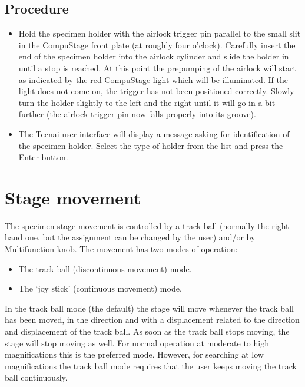 \documentclass[12pt]{article}
\begin{document}
\subsection{Procedure}
\begin{itemize}
\item Hold the specimen holder with the airlock trigger pin parallel
to the small slit in the CompuStage front plate (at roughly four
o'clock). Carefully insert the end of the specimen holder into the
airlock cylinder and slide the holder in until a stop is reached. At
this point the prepumping of the airlock will start as indicated by the
red CompuStage light which will be illuminated. If the light does not
come on, the trigger has not been positioned correctly. Slowly turn
the holder slightly to the left and the right until it will go in a
bit further (the airlock trigger pin now falls properly into its groove).

\item The Tecnai user interface will display a message asking for
identification of the specimen holder. Select the type of holder from
the list and press the Enter button.

\end{itemize}

\section{Stage movement}

The specimen stage movement is controlled by a track ball (normally the
right-hand one, but the assignment can be changed by the user) and/or
by Multifunction knob. The movement has two modes of operation:

\begin{itemize}
\item The track ball (discontinuous movement) mode.
\item The `joy stick' (continuous movement) mode.
\end{itemize}

In the track ball mode (the default) the stage will move whenever the
track ball has been moved, in the direction and with a displacement
related to the direction and displacement of the track ball. As soon as
the track ball stops moving, the stage will stop moving as well. For
normal operation at moderate to high magnifications this is the
preferred mode. However, for searching at low magnifications the
track ball mode requires that the user keeps moving the track ball
continuously.
\end{document}
